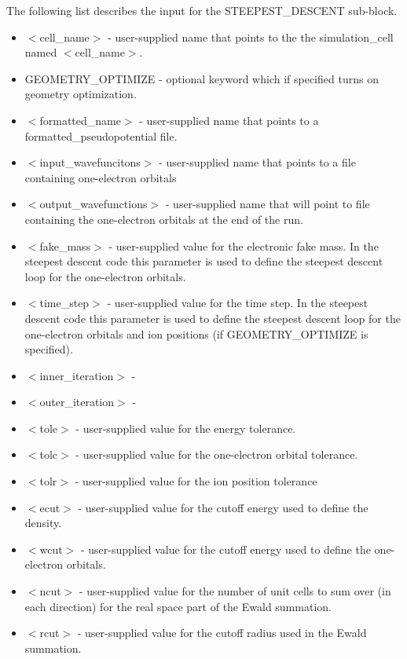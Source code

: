 The following list describes the input for the STEEPEST\_DESCENT
sub-block.
\begin{itemize}
	\item $<$cell\_name$>$ - user-supplied name that points to the
              the simulation\_cell named $<$cell\_name$>$.
	\item GEOMETRY\_OPTIMIZE - optional keyword which if specified
	      turns on geometry optimization. 	
	\item $<$formatted\_name$>$ - user-supplied name that points
              to a formatted\_pseudopotential file.
	\item $<$input\_wavefuncitons$>$ - user-supplied name that points
              to a file containing one-electron orbitals
	\item $<$output\_wavefunctions$>$ - user-supplied name that will
              point to file containing the one-electron orbitals at the
              end of the run. 
	\item $<$fake\_mass$>$ - user-supplied value for the electronic
              fake mass.  In the steepest descent code this parameter is
              used to define the steepest descent loop for the one-electron
              orbitals.
	\item $<$time\_step$>$ - user-supplied value for the time step.
               In the steepest descent code this parameter is used to
               define the steepest descent loop for the one-electron orbitals
               and ion positions (if GEOMETRY\_OPTIMIZE is specified).
	\item $<$inner\_iteration$>$ -
	\item $<$outer\_iteration$>$ -
 	\item $<$tole$>$ - user-supplied value for the energy tolerance.
	\item $<$tolc$>$ - user-supplied value for the one-electron orbital
                           tolerance.
	\item $<$tolr$>$ - user-supplied value for the ion position tolerance
	\item $<$ecut$>$ - user-supplied value for the cutoff energy used
                           to define the density.
	\item $<$wcut$>$ - user-supplied value for the cutoff energy used
 			   to define the one-electron orbitals.
	\item $<$ncut$>$ - user-supplied value for the number of unit cells
 			  to sum over (in each direction) for the real space
			  part of the Ewald summation.
	\item $<$rcut$>$ - user-supplied value for the cutoff radius used
			  in the Ewald summation.
\end{itemize}




